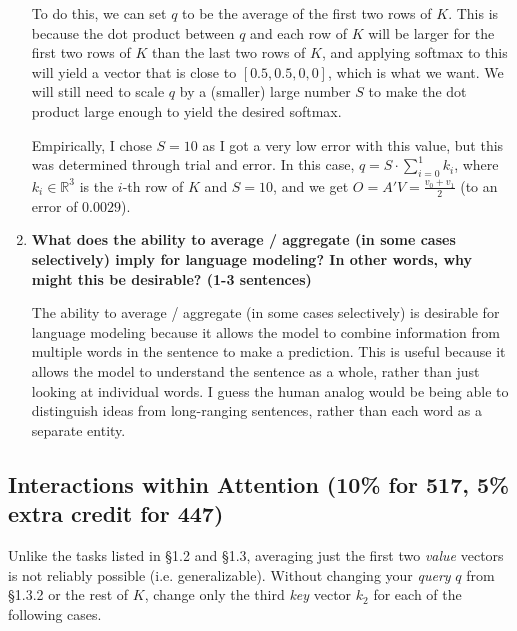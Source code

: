\documentclass{article}
\begin{document}
\begin{enumerate}
    To do this, we can set $q$ to be the average of the first two rows of $K$.
    This is because the dot product between $q$ and each row of $K$ will be
    larger for the first two rows of $K$ than the last two rows of $K$, and
    applying softmax to this will yield a vector that is close to $[0.5, 0.5, 0,
    0]$, which is what we want. We will still need to scale $q$ by a (smaller)
    large number $S$ to make the dot product large enough to yield the desired
    softmax.

    Empirically, I chose $S = 10$ as I got a very low error with this value, but
    this was determined through trial and error. In this case, $\boxed{q = S
    \cdot \sum_{i=0}^{1} k_i}$, where $k_i \in \mathbb{R}^{3}$ is the $i$-th row
    of $K$ and $S = 10$, and we get $O = A' V = \frac{v_0 + v_1}{2}$ (to an
    error of $0.0029$).


    \item \textbf{What does the ability to average / aggregate (in some cases
    selectively) imply for language modeling? In other words, why might this be
    desirable? (1-3 sentences)}

    The ability to average / aggregate (in some cases selectively) is desirable
    for language modeling because it allows the model to combine information
    from multiple words in the sentence to make a prediction. This is useful
    because it allows the model to understand the sentence as a whole, rather
    than just looking at individual words. I guess the human analog would be
    being able to distinguish ideas from long-ranging sentences, rather than
    each word as a separate entity.

\end{enumerate}

\subsection{Interactions within Attention (10\% for 517, 5\% extra credit for 447)}

 Unlike the tasks listed in \S 1.2 and \S 1.3, averaging just the first two
 \textit{value} vectors is not reliably possible (i.e. generalizable). Without
 changing your \textit{query} $q$ from \S 1.3.2 or the rest of $K$, change only
 the third \textit{key} vector $k_2$ for each of the following cases.
    
\end{document}
